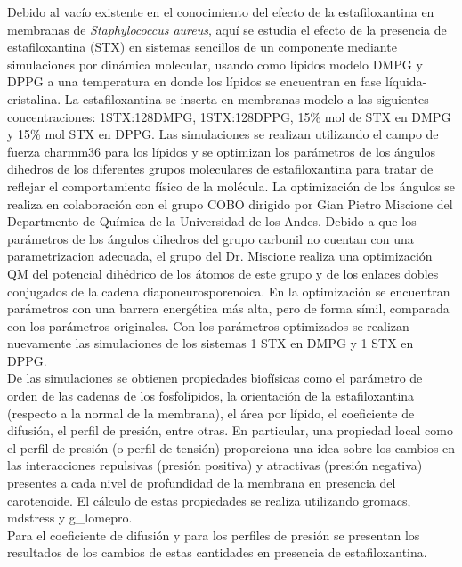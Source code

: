 Debido al vac\'{i}o existente en el conocimiento del efecto de la estafiloxantina en membranas de \textit{Staphylococcus aureus}, aqu\'{i} se estudia el efecto de la presencia de estafiloxantina (STX) en sistemas sencillos de un componente mediante simulaciones por din\'{a}mica molecular, usando como l\'{i}pidos modelo DMPG y DPPG a una temperatura en donde los l\'{i}pidos se encuentran en fase l\'{i}quida-cristalina. La estafiloxantina se inserta en membranas modelo a las siguientes concentraciones: 1STX:128DMPG, 1STX:128DPPG, 15\% mol de STX en DMPG y 15\% mol STX en DPPG. Las simulaciones se realizan utilizando el campo de fuerza charmm36 para los l\'{i}pidos y se optimizan los par\'{a}metros de los \'{a}ngulos dihedros de los diferentes grupos moleculares de estafiloxantina para tratar de reflejar el comportamiento f\'{i}sico de la mol\'{e}cula. La optimizaci\'{o}n de los \'{a}ngulos se realiza en colaboraci\'{o}n con el grupo COBO dirigido por Gian Pietro Miscione del Departmento de Qu\'{i}mica de la Universidad de los Andes. Debido a que los par\'{a}metros de los \'{a}ngulos dihedros del grupo carbonil no cuentan con una parametrizacion adecuada, el grupo del Dr. Miscione realiza una optimizaci\'{o}n QM del potencial dih\'{e}drico de los \'{a}tomos de este grupo y de los enlaces dobles conjugados de la cadena diaponeurosporenoica. En la optimizaci\'{o}n se encuentran par\'{a}metros con una barrera energ\'{e}tica m\'{a}s alta, pero de forma s\'{i}mil, comparada con los par\'{a}metros originales. Con los par\'{a}metros optimizados se realizan nuevamente las simulaciones de los sistemas 1 STX en DMPG y 1 STX en DPPG.\\
De las simulaciones se obtienen propiedades biof\'{i}sicas como el par\'{a}metro de orden de las cadenas de los fosfol\'{i}pidos, la orientaci\'{o}n de la estafiloxantina (respecto a la normal de la membrana), el \'{a}rea por l\'{i}pido, el coeficiente de difusi\'{o}n, el perfil de presi\'{o}n, entre otras. En particular, una propiedad local como el perfil de presi\'{o}n (o perfil de tensi\'{o}n) proporciona una idea sobre los cambios en las interacciones repulsivas (presi\'{o}n positiva) y atractivas (presi\'{o}n negativa) presentes a cada nivel de profundidad de la membrana en presencia del carotenoide. 
El c\'{a}lculo de estas propiedades se realiza utilizando gromacs, mdstress y g\_lomepro.\\
Para el coeficiente de difusi\'{o}n y para los perfiles de presi\'{o}n se presentan los resultados de los cambios de estas cantidades en presencia de estafiloxantina.
